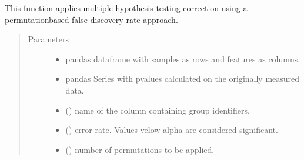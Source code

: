 \documentclass[letterpaper,10pt,english]{sphinxmanual}
\begin{document}

\begin{fulllineitems}
\label{\detokenize{_autosummary/analytics_core.analytics:analytics_core.analytics.analytics.apply_pvalue_permutation_fdrcorrection}}
This function applies multiple hypothesis testing correction using a permutation\sphinxhyphen{}based false discovery rate approach.
\begin{quote}\begin{description}
\item[{Parameters}] \leavevmode\begin{itemize}
\item {} 
 \textendash{} pandas dataframe with samples as rows and features as columns.

\item {} 
 \textendash{} pandas Series with p\sphinxhyphen{}values calculated on the originally measured data.

\item {} 
 () \textendash{} name of the column containing group identifiers.

\item {} 
 () \textendash{} error rate. Values velow alpha are considered significant.

\item {} 
 () \textendash{} number of permutations to be applied.

\end{itemize}


\end{description}
\end{quote}
\end{fulllineitems}
\end{document}
